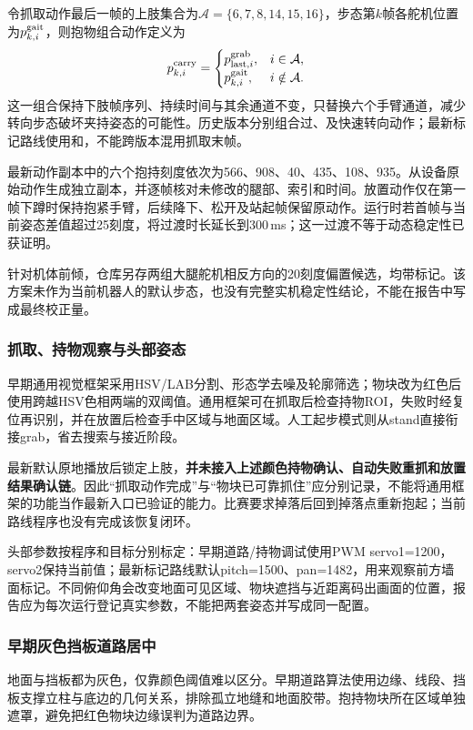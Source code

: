 令抓取动作最后一帧的上肢集合为$\mathcal A=\{6,7,8,14,15,16\}$，步态第$k$帧各舵机位置为$p_{k,i}^{\rm gait}$，则抱物组合动作定义为
\begin{equation}
p_{k,i}^{\rm carry}=\begin{cases}
p_{{\rm last},i}^{\rm grab},&i\in\mathcal A,\\
p_{k,i}^{\rm gait},&i\notin\mathcal A.
\end{cases}
\end{equation}
这一组合保持下肢帧序列、持续时间与其余通道不变，只替换六个手臂通道，减少转向步态破坏夹持姿态的可能性。历史版本分别组合过、及快速转向动作；最新标记路线使用和，不能跨版本混用抓取末帧。

最新动作副本中的六个抱持刻度依次为566、908、40、435、108、935。从设备原始动作生成独立副本，并逐帧核对未修改的腿部、索引和时间。放置动作仅在第一帧下蹲时保持抱紧手臂，后续降下、松开及站起帧保留原动作。运行时若首帧与当前姿态差值超过25刻度，将过渡时长延长到300\,ms；这一过渡不等于动态稳定性已获证明。

针对机体前倾，仓库另存两组大腿舵机相反方向的20刻度偏置候选，均带标记。该方案未作为当前机器人的默认步态，也没有完整实机稳定性结论，不能在报告中写成最终校正量。

\subsubsection{抓取、持物观察与头部姿态}
早期通用视觉框架采用HSV/LAB分割、形态学去噪及轮廓筛选；物块改为红色后使用跨越HSV色相两端的双阈值。通用框架可在抓取后检查持物ROI，失败时经复位再识别，并在放置后检查手中区域与地面区域。人工起步模式则从stand直接衔接grab，省去搜索与接近阶段。

最新默认原地播放后锁定上肢，\textbf{并未接入上述颜色持物确认、自动失败重抓和放置结果确认链}。因此“抓取动作完成”与“物块已可靠抓住”应分别记录，不能将通用框架的功能当作最新入口已验证的能力。比赛要求掉落后回到掉落点重新抱起；当前路线程序也没有完成该恢复闭环。

头部参数按程序和目标分别标定：早期道路/持物调试使用PWM servo1=1200，servo2保持当前值；最新标记路线默认pitch=1500、pan=1482，用来观察前方墙面标记。不同俯仰角会改变地面可见区域、物块遮挡与近距离码出画面的位置，报告应为每次运行登记真实参数，不能把两套姿态并写成同一配置。

\subsubsection{早期灰色挡板道路居中}
地面与挡板都为灰色，仅靠颜色阈值难以区分。早期道路算法使用边缘、线段、挡板支撑立柱与底边的几何关系，排除孤立地缝和地面胶带。抱持物块所在区域单独遮罩，避免把红色物块边缘误判为道路边界。

